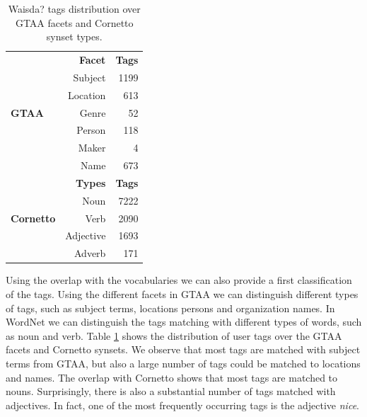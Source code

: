 \begin{table}[tb]
\centering
\begin{footnotesize}
\begin{tabular*}{\columnwidth}{@{\extracolsep{\fill}}lrr}
\toprule
\multirow{7}{*}{\textbf{GTAA}} & \textbf{Facet}\B \T & \textbf{Tags} \\
  \cline{2-3}
 & Subject \T \B & 1199\\
 & Location \B &  613 \\
 & Genre \B & 52\\
 & Person \B & 118\\
 & Maker \B & 4\\
 & Name \B & 673\\
\hline
\multirow{5}{*}{\textbf{Cornetto}} & \textbf{Types} \B \T & \textbf{Tags} \\
\cline{2-3}
 & Noun \T \B &  7222 \\
 & Verb \B & 2090 \\
 & Adjective \B & 1693\\
 & Adverb \B & 171\\
\bottomrule
\end{tabular*}
\end{footnotesize}
\caption{Waisda? tags distribution over GTAA facets and Cornetto synset types.}
\label{tag_dist_over_Cornetto_GTAA}
\end{table}

Using the overlap with the vocabularies we can also provide a first
classification of the tags. Using the different facets in GTAA we can
distinguish different types of tags, such as subject terms, locations persons
and organization names. In WordNet we can distinguish the tags matching with
different types of words, such as noun and verb. Table
\ref{tag_dist_over_Cornetto_GTAA} shows the distribution of user tags over the
GTAA facets and Cornetto synsets. We observe that most tags are matched with
subject terms from GTAA, but also a large number of tags could be matched to
locations and names. The overlap with Cornetto shows that most tags are
matched to nouns. Surprisingly, there is also a substantial number of tags
matched with adjectives. In fact, one of the most frequently occurring tags is
the adjective \textit{nice}.

